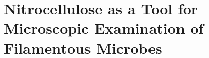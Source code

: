 \chapter{Nitrocellulose as a Tool for Microscopic Examination of Filamentous Microbes}\label{ch:NitroAssay}







